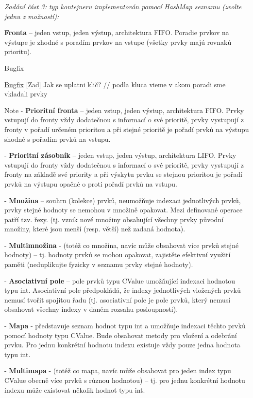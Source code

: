{\itshape Zadání část 3\+: typ kontejneru implementován pomocí Hash\+Map seznamu (zvolte jednu z možností)\+:}
\begin{DoxyItemize}
\item {\bfseries Fronta} – jeden vstup, jeden výstup, architektura F\+I\+FO. Poradie prvkov na výstupe je zhodné s poradím prvkov na vstupe (všetky prvky majú rovnakú prioritu). \begin{DoxyRefDesc}{Bugfix}
\item[\hyperlink{bugfix__bugfix000012}{Bugfix}]\mbox{[}Zad\mbox{]} Jak se uplatni klič? // podla kluca vieme v akom poradi sme vkladali prvky\end{DoxyRefDesc}

\end{DoxyItemize}

\begin{DoxyNote}{Note}
-\/ {\bfseries Prioritní fronta} – jeden vstup, jeden výstup, architektura F\+I\+FO. Prvky vstupují do fronty vždy dodatečnou s informací o své prioritě, prvky vystupují z fronty v pořadí určeném prioritou a při stejné prioritě je pořadí prvků na výstupu shodné s pořadím prvků na vstupu. 

-\/ {\bfseries Prioritní zásobník} – jeden vstup, jeden výstup, architektura L\+I\+FO. Prvky vstupují do fronty vždy dodatečnou s informací o své prioritě, prvky vystupují z fronty na základě své priority a při výskytu prvku se stejnou prioritou je pořadí prvků na výstupu opačné o proti pořadí prvků na vstupu. 

-\/ {\bfseries Množina} – souhrn (kolekce) prvků, neumožňuje indexaci jednotlivých prvků, prvky stejné hodnoty se nemohou v množině opakovat. Mezi definované operace patří tzv. řezy. (tj. vznik nové množiny obsahující všechny prvky původní množiny, které jsou menší (resp. větší) než zadaná hodnota). 

-\/ {\bfseries Multimnožina} -\/ (totéž co množina, navíc může obsahovat více prvků stejné hodnoty) – tj. hodnoty prvků se mohou opakovat, zajistěte efektivní využití paměti (neduplikujte fyzicky v seznamu prvky stejné hodnoty). 

-\/ {\bfseries Asociativní pole} – pole prvků typu {\ttfamily C\+Value} umožňující indexaci hodnotou typu {\ttfamily int}. Asociativní pole předpokládá, že indexy jednotlivých vložených prvků nemusí tvořit spojitou řadu (tj. asociativní pole je pole prvků, který nemusí obsahovat všechny indexy v daném rozsahu posloupnosti). 

-\/ {\bfseries Mapa} -\/ představuje seznam hodnot typu {\ttfamily int} a umožňuje indexaci těchto prvků pomocí hodnoty typu {\ttfamily C\+Value}. Bude obsahovat metody pro vložení a odebrání prvku. Pro jednu konkrétní hodnotu indexu existuje vždy pouze jedna hodnota typu {\ttfamily int}. 

-\/ {\bfseries Multimapa} -\/ (totéž co mapa, navíc může obsahovat pro jeden index typu {\ttfamily C\+Value} obecně více prvků s různou hodnotou) – tj. pro jednu konkrétní hodnotu indexu může existovat několik hodnot typu {\ttfamily int}.
\end{DoxyNote}




